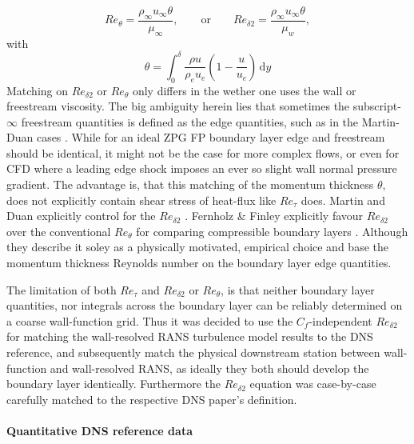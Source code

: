 \begin{equation}
    Re_\theta = \frac{\rho_\infty u_\infty \theta}{\mu_\infty}, \qquad \text{or} \qquad Re_{\delta2} = \frac{\rho_\infty u_\infty \theta}{\mu_w},
\end{equation}
with
\begin{equation}
    \theta = \int_0^\delta \frac{\rho u}{\rho_e u_e}\left(1 - \frac{u}{u_e}\right)\,\mathrm{d}y
\end{equation}
Matching on \(Re_{\delta2}\) or \(Re_\theta\) only differs in the wether one uses the wall or freestream viscosity. The big ambiguity herein lies that sometimes the subscript-\(\infty\) freestream quantities is defined as the edge quantities, such as in the Martin-Duan cases \cite[Section 2.1]{duan2010direct_part2}. While for an ideal ZPG FP boundary layer edge and freestream should be identical, it might not be the case for more complex flows, or even for CFD where a leading edge shock imposes an ever so slight wall normal pressure gradient. The advantage is, that this matching of the momentum thickness \(\theta\), does not explicitly contain shear stress of heat-flux like \(Re_\tau\) does. Martin and Duan explicitly control for the \(Re_{\delta2}\) \cite{duan2010direct_part2}. Fernholz \& Finley explicitly favour \(Re_{\delta2}\) over the conventional \(Re_\theta\) for comparing compressible boundary layers \cite{fernholz1980critical}. Although they describe it soley as a physically motivated, empirical choice and base the momentum thickness Reynolds number on the boundary layer edge quantities.
\par\medskip

The limitation of both \(Re_\tau\) and \(Re_{\delta2}\) or \(Re_\theta\), is that neither boundary layer quantities, nor integrals across the boundary layer can be reliably determined on a coarse wall-function grid. Thus it was decided to use the \(C_f\)-independent \(Re_{\delta2}\) for matching the wall-resolved RANS turbulence model results to the DNS reference, and subsequently match the physical downstream station between wall-function and wall-resolved RANS, as ideally they both should develop the boundary layer identically. Furthermore the \(Re_{\delta2}\) equation was case-by-case carefully matched to the respective DNS paper's definition.

\paragraph*{Quantitative DNS reference data}


